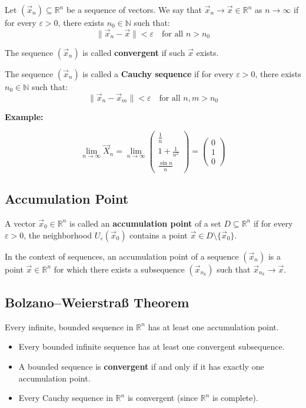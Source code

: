 Let \( (\vec{x}_n) \subseteq \mathbb{R}^n \) be a sequence of vectors. We say that \( \vec{x}_n \to \vec{x} \in \mathbb{R}^n \) as \( n \to \infty \) if for every \( \varepsilon > 0 \), there exists \( n_0 \in \mathbb{N} \) such that:
\[
\|\vec{x}_n - \vec{x}\| < \varepsilon \quad \text{for all } n > n_0
\]

The sequence \( (\vec{x}_n) \) is called \textbf{convergent} if such \( \vec{x} \) exists.

The sequence \( (\vec{x}_n) \) is called a \textbf{Cauchy sequence} if for every \( \varepsilon > 0 \), there exists \( n_0 \in \mathbb{N} \) such that:
\[
\|\vec{x}_n - \vec{x}_m\| < \varepsilon \quad \text{for all } n, m > n_0
\]

\textbf{Example: }

\[
\lim_{n \to \infty} \vec{X}_n = \lim_{n \to \infty} \begin{pmatrix} \frac{1}{n} \\
1 + \frac{1}{n^2} \\ \frac{\sin n}{n}\end{pmatrix} = \begin{pmatrix}
    0 \\ 1 \\ 0
\end{pmatrix}
\]

\subsection{Accumulation Point}

A vector \( \vec{x}_0 \in \mathbb{R}^n \) is called an \textbf{accumulation point} of a set \( D \subseteq \mathbb{R}^n \) if for every \( \varepsilon > 0 \), the neighborhood \( U_\varepsilon(\vec{x}_0) \) contains a point \( \vec{x} \in D \setminus \{\vec{x}_0\} \).

In the context of sequences, an accumulation point of a sequence \( (\vec{x}_n) \) is a point \( \vec{x} \in \mathbb{R}^n \) for which there exists a subsequence \( (\vec{x}_{n_k}) \) such that \( \vec{x}_{n_k} \to \vec{x} \).

\subsection{Bolzano–Weierstraß Theorem}

Every infinite, bounded sequence in \( \mathbb{R}^n \) has at least one accumulation point.

\begin{itemize}[label=\(-\)]
\item Every bounded infinite sequence has at least one convergent subsequence.
\item A bounded sequence is \textbf{convergent} if and only if it has exactly one accumulation point.
\item Every Cauchy sequence in \( \mathbb{R}^n \) is convergent (since \( \mathbb{R}^n \) is complete).
\end{itemize}


